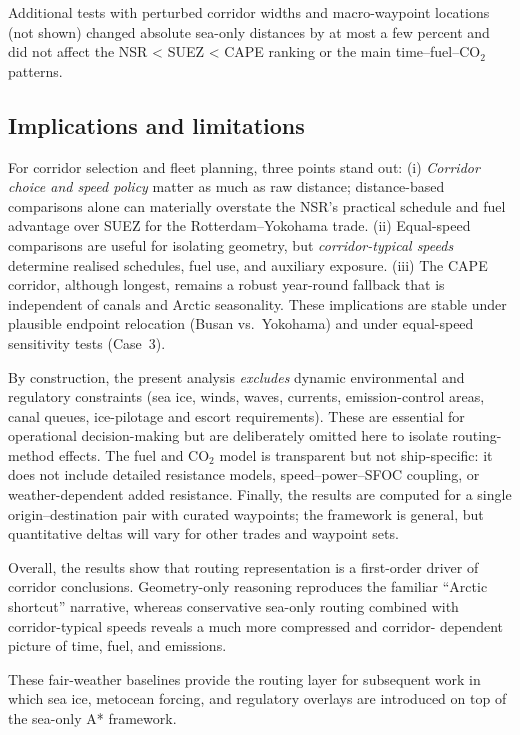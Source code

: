 Additional tests with perturbed corridor widths and macro-waypoint locations (not shown) changed absolute sea-only distances by at most a few percent and did not affect the NSR < SUEZ < CAPE ranking or the main time–fuel–CO$_2$ patterns.

\subsection{Implications and limitations}\label{sec:implications}

For corridor selection and fleet planning, three points stand out:
(i) \emph{Corridor choice and speed policy} matter as much as raw distance; 
distance-based comparisons alone can materially overstate the NSR’s practical 
schedule and fuel advantage over SUEZ for the Rotterdam--Yokohama trade. 
(ii) Equal-speed comparisons are useful for isolating geometry, but 
\emph{corridor-typical speeds} determine realised schedules, fuel use, and 
auxiliary exposure. 
(iii) The CAPE corridor, although longest, remains a robust year-round fallback 
that is independent of canals and Arctic seasonality. These implications are 
stable under plausible endpoint relocation (Busan vs.\ Yokohama) and under 
equal-speed sensitivity tests (Case~3).

By construction, the present analysis \emph{excludes} dynamic environmental and 
regulatory constraints (sea ice, winds, waves, currents, emission-control areas, 
canal queues, ice-pilotage and escort requirements). These are essential for 
operational decision-making but are deliberately omitted here to isolate 
routing-method effects. The fuel and CO$_2$ model is transparent but not 
ship-specific: it does not include detailed resistance models, 
speed--power--SFOC coupling, or weather-dependent added resistance. Finally, the 
results are computed for a single origin--destination pair with curated 
waypoints; the framework is general, but quantitative deltas will vary for 
other trades and waypoint sets.

Overall, the results show that routing representation is a first-order driver 
of corridor conclusions. Geometry-only reasoning reproduces the familiar 
``Arctic shortcut'' narrative, whereas conservative sea-only routing combined 
with corridor-typical speeds reveals a much more compressed and corridor- 
dependent picture of time, fuel, and emissions.

These fair-weather baselines provide the routing layer for subsequent work in which sea ice, metocean forcing, and regulatory overlays are introduced on top of the sea-only A* framework.